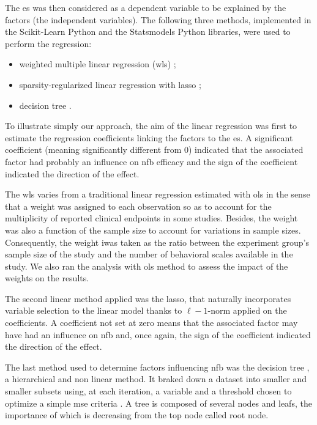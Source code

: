 The \gls{es} was then considered as a dependent variable to be explained by the factors (the independent variables). The  following three methods, 
implemented in the Scikit-Learn Python \citep[0.18.1]{Pedregosa2011} and the Statsmodels Python
\citep[0.8.0]{Seabold2010} libraries, were used to perform the regression:
\begin{itemize}
\item weighted multiple linear regression (\gls{wls}) \citep{Montgomery2012};
	\item sparsity-regularized linear regression with \gls{lasso} \citep{Tibshirani1996};
	\item decision tree \citep{Quinlan1986}.
\end{itemize}

To illustrate simply our approach, the aim of the linear regression was first to estimate the regression coefficients
linking the factors to the \gls{es}. A significant coefficient (meaning significantly different from 0) indicated 
that the associated factor had probably an influence on \gls{nfb} efficacy and the sign of the coefficient indicated the direction of the effect.

The \gls{wls} varies from a traditional linear regression estimated with \gls{ols} in the sense that a 
    weight was assigned to each observation so as to account for the multiplicity of reported clinical endpoints in some
    studies. Besides, the weight was also a function of the sample size to account for variations in sample sizes.
    Consequently, the weight iwas taken as the ratio between the experiment group's sample size of the study and 
the number of behavioral scales available in the study. 
We also ran the analysis with \gls{ols} method to assess the impact of the weights on the results. 

The second linear method applied was the \gls{lasso}, that naturally incorporates variable selection 
to the linear model thanks to $\ell-1$-norm applied on the coefficients. A coefficient not set at zero means that 
the associated factor may have had an influence on \gls{nfb} and, once again, the sign of the coefficient indicated the direction of the effect.

The last method used to determine factors influencing \gls{nfb} was the decision tree \citep{Quinlan1986}, a hierarchical and non linear method.
It braked down a dataset into smaller and smaller subsets using, at each iteration, a variable and a threshold chosen to optimize a simple \gls{mse} 
criteria \citep{James2013}. A tree is composed of several nodes and leafs, the importance of which is decreasing from the top node called root node. 

